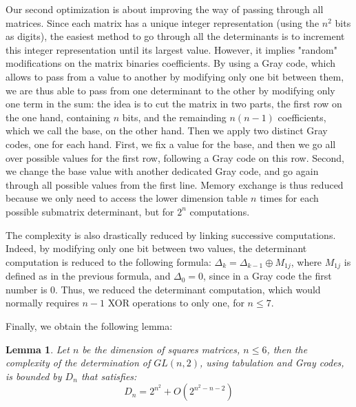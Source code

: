 \documentclass{article}\usepackage{amsthm}
\newtheorem{mylem}{Lemma}
\begin{document}
Our second optimization is about improving the way of passing through all
matrices. Since each matrix has a unique integer representation (using the $n^2$
bits as digits), the easiest method to go through all the determinants is to
increment this integer representation until its largest value. However, it implies "random" modifications on the matrix binaries coefficients. By using a Gray code, which allows to pass from a value to another by modifying only one bit between them, we are thus able to pass from one determinant to the other by modifying only one term in the sum:
the idea is to cut the matrix in two parts, the first row on the one hand, containing $n$ bits, and the remainding ${n(n-1)}$ coefficients, which we call the base, on the other hand.
Then we apply two distinct Gray codes, one for each hand. 
First, we fix a value for the base, and then we go all over possible values for the first row, following a Gray code on this row. 
Second, we change the base value with another dedicated Gray code, and go again through all possible values from the first line. 
Memory exchange is thus reduced because we only need to access the lower dimension table $n$ times for each possible submatrix determinant, but for $2^n$ computations. 

The complexity is also drastically reduced by linking successive computations. Indeed, by modifying only one bit between two values, the determinant computation is reduced to the following formula: 
$\Delta_{k} = \Delta_{k-1} \oplus M_{1j}$, where $ M_{1j}$ is defined as in the previous formula, and $\Delta_0 = 0 $, since in a Gray code the first number is $0$. 
Thus, we reduced the determinant computation, which would normally requires $n-1$ XOR operations to only one, for $n \le 7$. 

Finally, we obtain the following lemma: 
\begin{mylem}
Let $n$ be the dimension of squares matrices, $n \le 6$, then the complexity of the determination of $GL(n,2)$, using tabulation and Gray codes, is bounded by $D_n$ that satisfies:
\begin{equation}
D_n = 2^{n^2} + O(2^{n^2-n-2})
\end{equation}
\end{mylem}
\end{document}
